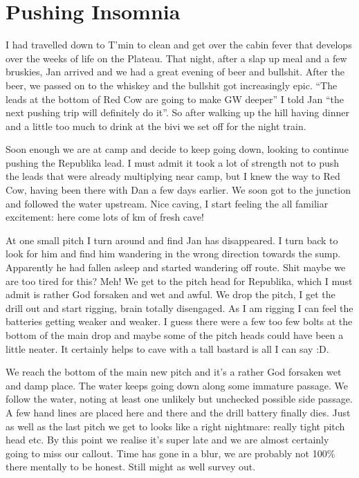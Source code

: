 
\hypertarget{pushing-insomnia}{%
\section{Pushing Insomnia}\label{pushing-insomnia}}

I had travelled down to T'min to clean and get over the cabin fever that
develops over the weeks of life on the Plateau. That night, after a slap
up meal and a few bruskies, Jan arrived and we had a great evening of
beer and bullshit. After the beer, we passed on to the whiskey and the
bullshit got increasingly epic. ``The leads at the bottom of Red Cow are
going to make GW deeper'' I told Jan ``the next pushing trip will
definitely do it''. So after walking up the hill having dinner and a
little too much to drink at the bivi we set off for the night train.

Soon enough we are at camp and decide to keep going down, looking to
continue pushing the Republika lead. I must admit it took a lot of
strength not to push the leads that were already multiplying near camp,
but I knew the way to Red Cow, having been there with Dan a few days
earlier. We soon got to the junction and followed the water upstream.
Nice caving, I start feeling the all familiar excitement: here come lots
of km of fresh cave!

At one small pitch I turn around and find Jan has disappeared. I turn
back to look for him and find him wandering in the wrong direction
towards the sump. Apparently he had fallen asleep and started wandering
off route. Shit maybe we are too tired for this? Meh! We get to the
pitch head for Republika, which I must admit is rather God forsaken and
wet and awful. We drop the pitch, I get the drill out and start rigging,
brain totally disengaged. As I am rigging I can feel the batteries
getting weaker and weaker. I guess there were a few too few bolts at the
bottom of the main drop and maybe some of the pitch heads could have
been a little neater. It certainly helps to cave with a tall bastard is
all I can say :D.

We reach the bottom of the main new pitch and it's a rather God forsaken
wet and damp place. The water keeps going down along some immature
passage. We follow the water, noting at least one unlikely but unchecked
possible side passage. A few hand lines are placed here and there and
the drill battery finally dies. Just as well as the last pitch we get to
looks like a right nightmare: really tight pitch head etc. By this point
we realise it's super late and we are almost certainly going to miss our
callout. Time has gone in a blur, we are probably not 100\% there
mentally to be honest. Still might as well survey out.

